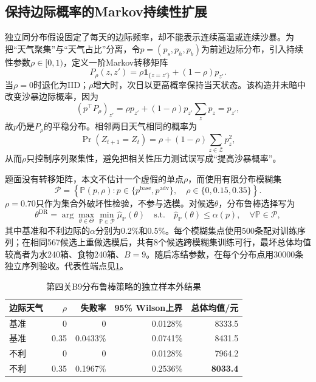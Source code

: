 \subsection{保持边际概率的Markov持续性扩展}

独立同分布假设固定了每天的边际频率，却不能表示连续高温或连续沙暴。为把“天气聚集”与“天气占比”分离，令$p=(p_s,p_h,p_b)$为前述边际分布，引入持续性参数$\rho\in[0,1)$，定义一阶Markov转移矩阵
\begin{equation}
P_\rho(z,z')=\rho\bm 1_{\{z=z'\}}+(1-\rho)p_{z'}.
\label{eq:markov-persistence}
\end{equation}
当$\rho=0$时退化为IID；$\rho$增大时，次日以更高概率保持当天状态。该构造并未暗中改变沙暴边际概率，因为
\begin{equation}
(p^\top P_\rho)_{z'}
=\rho p_{z'}+(1-\rho)p_{z'}\sum_zp_z=p_{z'},
\label{eq:markov-stationary-proof}
\end{equation}
故$p$仍是$P_\rho$的平稳分布。相邻两日天气相同的概率为
\begin{equation}
\Pr(Z_{t+1}=Z_t)=\rho+(1-\rho)\sum_{z\in\mathcal Z}p_z^2,
\label{eq:same-weather-probability}
\end{equation}
从而$\rho$只控制序列聚集性，避免把相关性压力测试误写成“提高沙暴概率”。

题面没有转移矩阵，本文不估计一个虚假的单点$\rho$，而使用有限分布模糊集
\begin{equation}
\mathcal P=\left\{\mathbb P(p,\rho):
p\in\{p^{\mathrm{base}},p^{\mathrm{adv}}\},\quad
\rho\in\{0,0.15,0.35\}\right\}.
\label{eq:weather-ambiguity-set}
\end{equation}
$\rho=0.70$只作为集合外破坏性检验，不参与选模。对候选$\theta$，分布鲁棒选择写为
\begin{equation}
\theta^{\mathrm{DR}}
=\arg\max_{\theta\in\Theta}\min_{\mathbb P\in\mathcal P}
\widehat\mu_{\mathbb P}(\theta)
\quad\text{s.t.}\quad
\widehat p_{\mathbb P}(\theta)\le \alpha(p),\quad
\forall\mathbb P\in\mathcal P,
\label{eq:distributionally-robust-selection}
\end{equation}
其中基准和不利边际的$\alpha$分别为0.2\%和0.5\%。每个模糊集点使用500条配对训练序列；在相同567候选上重做选模后，共有8个候选跨模糊集训练可行，最坏总体均值较高者为水240箱、食物240箱、$B=9$。随后冻结参数，在每个分布点用30000条独立序列验收。代表性端点见\cref{tab:level4-robust}。

\begin{table}[H]
\centering
\caption{第四关B9分布鲁棒策略的独立样本外结果}
\label{tab:level4-robust}
\begin{tabular}{lrrrr}
\toprule
边际天气 & $\rho$ & 失败率 & 95\% Wilson上界 & 总体均值/元\\
\midrule
基准 & 0 & 0 & 0.0128\% & 8333.5\\
基准 & 0.35 & 0.0433\% & 0.0741\% & 8431.5\\
不利 & 0 & 0 & 0.0128\% & 7964.2\\
不利 & 0.35 & 0.1967\% & 0.2536\% & \textbf{8033.4}\\
\bottomrule
\end{tabular}
\end{table}

